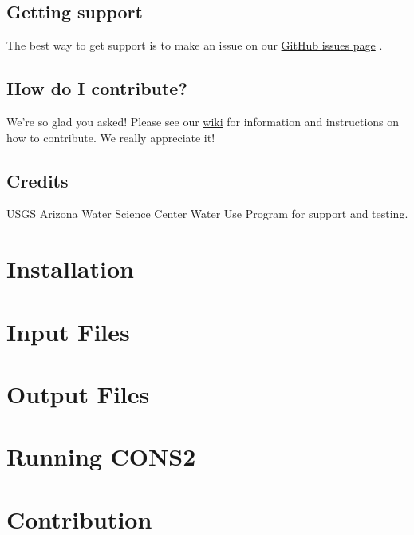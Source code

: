 \documentclass[letterpaper,10pt,english]{sphinxmanual}
\begin{document}
\subsection{Getting support}
\label{\detokenize{overview:getting-support}}
The best way to get support is to make an issue on our
\href{https://github.com/pvlib/pvlib-python/issues}{GitHub issues page} .


\subsection{How do I contribute?}
\label{\detokenize{overview:how-do-i-contribute}}
We're so glad you asked! Please see our
\href{https://github.com/pvlib/pvlib-python/wiki/Contributing-to-pvlib-python}{wiki}
for information and instructions on how to contribute.
We really appreciate it!


\subsection{Credits}
\label{\detokenize{overview:credits}}
USGS Arizona Water Science Center Water Use Program for support and testing.


\section{Installation}
\label{\detokenize{installation:installation}}\label{\detokenize{installation::doc}}\label{\detokenize{installation:id1}}

\section{Input Files}
\label{\detokenize{input_files:input-files}}\label{\detokenize{input_files::doc}}\label{\detokenize{input_files:id1}}

\section{Output Files}
\label{\detokenize{output_files::doc}}\label{\detokenize{output_files:output-files}}\label{\detokenize{output_files:id1}}

\section{Running CONS2}
\label{\detokenize{run:running-cons2}}\label{\detokenize{run::doc}}\label{\detokenize{run:run}}

\section{Contribution}
\label{\detokenize{contribution::doc}}\label{\detokenize{contribution:contribution}}\label{\detokenize{contribution:id1}}
\end{document}
